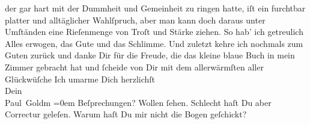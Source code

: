 \begin{ledgroupsized}[t]{13cm}
               der gar hart mit der Dummheit und Gemeinheit zu ringen hatte, iſt ein furchtbar
               platter und alltäglicher Wahlſpruch, aber man kann doch daraus unter Umſtänden eine
               Rieſenmenge von {\pb}Troſt und Stärke ziehen.\pend
           \pstart
           So hab’ ich getreulich Alles erwogen, das Gute und das Schlimme. Und zuletzt kehre
               ich nochmals zum Guten zurück und danke Dir für die Freude, die das kleine blaue Buch in mein Zimmer gebracht
               hat und ſcheide von Dir mit dem allerwärmſten aller Glückwüſche{\dotstwo}\pend
           \pstart
           Ich umarme Dich herzlichſt {\\[\baselineskip]}Dein {\\[\baselineskip]}\spacefill\mbox{Paul Goldm}\pend
           \leftskip=0em{}\pstart
           \noindent{}Beſprechungen? Wollen ſehen. Schlecht haſt Du aber Correctur geleſen. Warum haſt
                  Du mir nicht die Bogen geſchickt?\pend
           \pstart
           \label{T_L02703-1v}\label{T_L02703-1h}\pend
           \endnumbering{}\end{ledgroupsized}\begin{anhang}\end{anhang}\newcommand{\dateiname}{L02703}\newcommand{\titel}{Paul Goldmann an Arthur Schnitzler, 2. 11. [1892]}\newcommand{\editorInnen}{Martin Anton Müller und Laura Untner}
            \footnotesize
\begin{ledgroupsized}[t]{11.5cm}
\end{ledgroupsized}
         
      